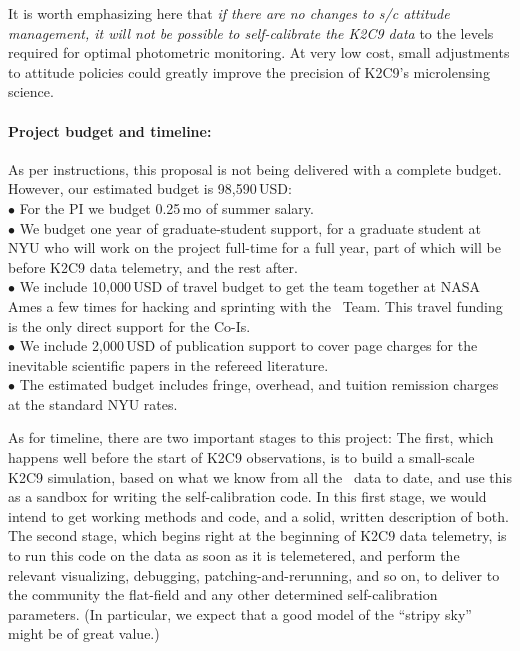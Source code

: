 \documentclass[12pt,preprint]{aastex}
\begin{document}
It is worth emphasizing here that \emph{if there are no changes to s/c
  attitude management, it will not be possible to self-calibrate the
  K2C9 data} to the levels required for optimal photometric monitoring.
At very low cost, small adjustments to attitude policies could greatly
improve the precision of K2C9's microlensing science.

\paragraph{Project budget and timeline:}

As per instructions, this proposal is not being delivered with a complete
budget.
However, our estimated budget is 98,590\,USD:\\
$\bullet$ For the PI we budget 0.25\,mo of summer salary.\\
$\bullet$ We budget one year of graduate-student support, for a
graduate student at NYU who will work on the project full-time for a full
year, part of which will be before K2C9 data telemetry, and the rest
after.\\
$\bullet$ We include 10,000\,USD of travel budget to get the team
together at NASA Ames a few times for hacking and sprinting with the
\ktwo\ Team.  This travel funding is the only direct support for the
Co-Is.\\
$\bullet$ We include 2,000\,USD of publication support to cover page
charges for the inevitable scientific papers in the refereed
literature.\\
$\bullet$ The estimated budget includes fringe, overhead, and tuition
remission charges at the standard NYU rates.

As for timeline, there are two important stages to this project:
The first, which happens well before the start of K2C9 observations,
is to build a small-scale K2C9 simulation, based on what we know from
all the \ktwo\ data to date, and use this as a sandbox for writing the
self-calibration code.
In this first stage, we would intend to get working methods and code,
and a solid, written description of both.
The second stage, which begins right at the beginning of K2C9 data
telemetry, is to run this code on the data as soon as it is
telemetered, and perform the relevant visualizing, debugging,
patching-and-rerunning, and so on, to deliver to the community the
flat-field and any other determined self-calibration parameters.
(In particular, we expect that a good model of the ``stripy sky''
might be of great value.)
\end{document}

